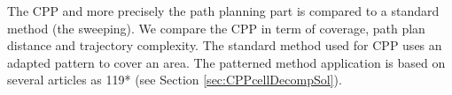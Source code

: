 The CPP and more precisely the path planning part is compared to a standard method (the sweeping). We compare the CPP  in term of coverage, path plan distance and trajectory complexity. The standard method used for CPP uses an adapted pattern to cover an area. The patterned method application is based on several articles as \citep{144*torres2016,191*di2016,63*chao2008,66*galceran2013} 119* (see Section \ref{sec:CPPcellDecompSol}). %


